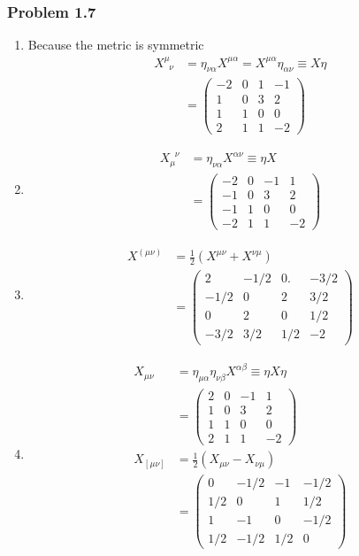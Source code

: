 \documentclass[10pt,a4paper]{book}
\theoremstyle{definition}
\begin{document}
\subsubsection{Problem 1.7}
\begin{enumerate}
\item Because the metric is symmetric
\begin{align}
 X^\mu_{\;\;\nu}&=\eta_{\nu\alpha}X^{\mu\alpha}=X^{\mu\alpha}\eta_{\alpha\nu}\equiv X\eta\\
 &=\begin{pmatrix}
-2 & 0 & 1 & -1\\
1 & 0 & 3 &  2\\
1 & 1 & 0 & 0\\
2 & 1 & 1 & -2
\end{pmatrix}
\end{align}

\item
\begin{align}
 X_\mu^{\;\;\nu}&=\eta_{\nu\alpha}X^{\alpha\nu}\equiv\eta X\\
 &=\begin{pmatrix}
-2 & 0 & -1 & 1\\
-1 & 0 & 3 &  2\\
-1 & 1 & 0 & 0\\
-2 & 1 & 1 & -2
\end{pmatrix}
\end{align}

\item 
\begin{align}
X^{(\mu\nu)}&=\frac{1}{2}(X^{\mu\nu}+X^{\nu\mu})\\
&=\begin{pmatrix}
2     & -1/2 & 0.  & -3/2\\
-1/2 & 0    & 2   &  3/2\\
0     & 2    & 0   & 1/2\\
-3/2 & 3/2 & 1/2 & -2
\end{pmatrix}
\end{align}

\item 
\begin{align}
X_{\mu\nu}&=\eta_{\mu\alpha}\eta_{\nu\beta}X^{\alpha\beta}\equiv\eta X\eta\\
&=\begin{pmatrix}
2 & 0 & -1 & 1\\
1 & 0 & 3 &  2\\
1 & 1 & 0 & 0\\
2 & 1 & 1 & -2
\end{pmatrix}\\
X_{[\mu\nu]}&=\frac{1}{2}(X_{\mu\nu}-X_{\nu\mu})\\
&=\begin{pmatrix}
0    & -1/2 & -1  & -1/2\\
1/2 & 0    & 1  &  1/2\\
1    & -1    & 0   & -1/2\\
1/2 & -1/2 & 1/2 & 0
\end{pmatrix}
\end{align}


\end{enumerate}
\end{document}
